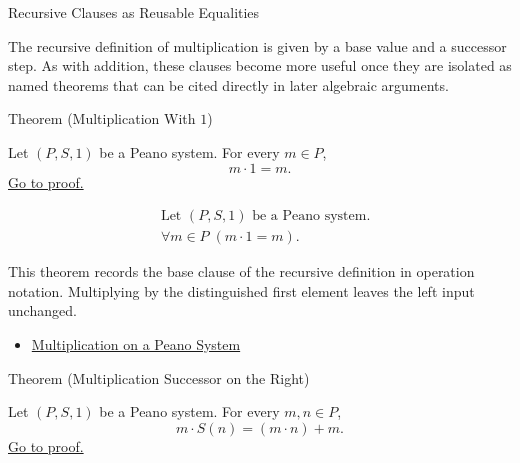 \begin{topicbox}{Recursive Clauses as Reusable Equalities}
\begin{exposition}
The recursive definition of multiplication is given by a base value and a
successor step. As with addition, these clauses become more useful once they
are isolated as named theorems that can be cited directly in later algebraic
arguments.
\end{exposition}

\begin{theorembox}{Theorem (Multiplication With \texorpdfstring{$1$}{1})}
\begin{theorem}
\label{thm:multiplication-with-one}
Let $(P,S,1)$ be a Peano system. For every $m \in P$,
\[
m \cdot 1 = m.
\]
\hyperref[prf:multiplication-with-one]{Go to proof.}
\end{theorem}
\end{theorembox}

\begin{remark*}
\[
\begin{aligned}
&\text{Let } (P,S,1) \text{ be a Peano system.}\\
&\forall m \in P\;(m \cdot 1 = m).
\end{aligned}
\]
\end{remark*}

\begin{remark*}[Interpretation]
This theorem records the base clause of the recursive definition in operation
notation. Multiplying by the distinguished first element leaves the left input
unchanged.
\end{remark*}

\begin{dependencies}
\begin{itemize}
  \item \hyperref[def:multiplication-on-peano-system]{Multiplication on a Peano System}
\end{itemize}
\end{dependencies}

\begin{theorembox}{Theorem (Multiplication Successor on the Right)}
\begin{theorem}
\label{thm:multiplication-successor-on-right}
Let $(P,S,1)$ be a Peano system. For every $m,n \in P$,
\[
m \cdot S(n) = (m \cdot n) + m.
\]
\hyperref[prf:multiplication-successor-on-right]{Go to proof.}
\end{theorem}
\end{theorembox}


\end{topicbox}
